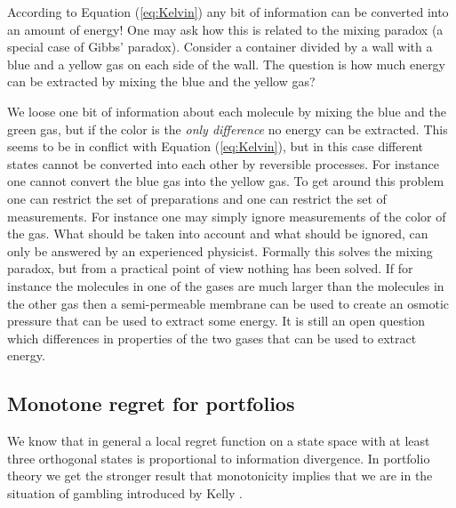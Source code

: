\documentclass[10pt,a4paper,draft]{article}
\begin{document}
According to Equation (\ref{eq:Kelvin}) any bit of information
can be converted into an amount of energy! One may ask how this is
related to the mixing paradox (a special case of Gibbs' paradox).
Consider a container divided by a wall with a blue and a yellow gas on
each side of the wall. The question is how much energy can be
extracted by mixing the blue and the yellow gas?
\begin{center}
\par\end{center}

We loose one bit of information about each molecule by mixing the blue and the green gas, but if the color is the \emph{only difference} no energy
can be extracted. This seems to be in conflict with Equation
(\ref{eq:Kelvin}),
but in this case different states cannot be converted into each
other by reversible processes. For instance one cannot convert the
blue gas into the yellow gas. To get around this problem one can
restrict the set of preparations and one can restrict the set of
measurements.
For instance one may simply ignore measurements of the color of
the gas. What should be taken into account and what should be
ignored, can only be answered by an experienced physicist. Formally this
solves the mixing paradox, but from a practical point of view nothing
has been solved. If for instance the molecules in one of the gases
are much larger than the molecules in the other gas then a
semi-permeable membrane can be used to create an osmotic pressure that can be
used to extract some energy. It is still an open question which
differences in properties of the two gases that can be used to extract
energy.

\subsection{Monotone regret for portfolios}
We know that in general a local regret function on a state space with at least three orthogonal states is proportional to information divergence. In portfolio theory we get the stronger result that monotonicity implies that we are in the situation of gambling introduced by Kelly \cite{Kelly1956}.
\end{document}
